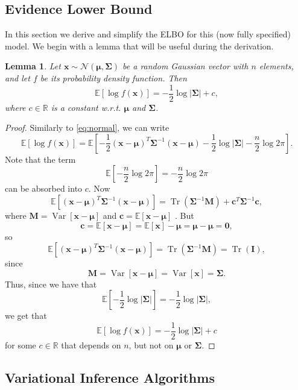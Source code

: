 \documentclass{mprop}
\newtheorem{lemma}{Lemma}
\theoremstyle{definition}
\DeclareMathOperator{\Tr}{Tr}
\DeclareMathOperator{\Var}{Var}
\begin{document}
\subsection{Evidence Lower Bound}

In this section we derive and simplify the ELBO for this (now fully specified)
model. We begin with a lemma that will be useful during the derivation.

\begin{lemma}
  Let $\mathbf{x} \sim \mathcal{N}(\bm\mu, \bm\Sigma)$ be a random Gaussian
  vector with $n$ elements, and let $f$ be its probability density function.
  Then
  \[ \mathbb{E}[\log f(\mathbf{x})] = -\frac{1}{2}\log |\bm\Sigma| + c, \]
  where $c \in \mathbb{R}$ is a constant w.r.t. $\bm\mu$ and $\bm\Sigma$.
\end{lemma}

\begin{proof} %
  Similarly to \eqref{eq:normal}, we can write
  \[ \mathbb{E}[\log f(\mathbf{x})] = \mathbb{E}\left[ -\frac{1}{2}(\mathbf{x} -
      \bm\mu)^T\bm\Sigma^{-1}(\mathbf{x} - \bm\mu) - \frac{1}{2}\log |\bm\Sigma|
      - \frac{n}{2}\log 2\pi \right]. \]
  Note that the term
  \[ \mathbb{E}\left[ -\frac{n}{2}\log 2\pi \right] = -\frac{n}{2}\log 2\pi \]
  can be absorbed into $c$. Now
  \[ \mathbb{E}[(\mathbf{x} - \bm\mu)^T\bm\Sigma^{-1}(\mathbf{x} - \bm\mu)] =
    \Tr(\bm\Sigma^{-1}\mathbf{M}) + \mathbf{c}^T\bm\Sigma^{-1}\mathbf{c}, \]
  where $\mathbf{M} = \Var[\mathbf{x} - \bm\mu]$ and $\mathbf{c} =
  \mathbb{E}[\mathbf{x} - \bm\mu]$ \cite{petersen2008matrix}. But
  \[ \mathbf{c} = \mathbb{E}[\mathbf{x} - \bm\mu] = \mathbb{E}[\mathbf{x}] -
    \bm\mu = \bm\mu - \bm\mu = \mathbf{0}, \]
  so
  \[ \mathbb{E}[(\mathbf{x} - \bm\mu)^T\bm\Sigma^{-1}(\mathbf{x} - \bm\mu)] =
    \Tr(\bm\Sigma^{-1}\mathbf{M}) = \Tr(\mathbf{I}), \]
  since
  \[ \mathbf{M} = \Var[\mathbf{x} - \bm\mu] = \Var[\mathbf{x}] = \bm\Sigma. \]
  Thus, since we have that
  \[ \mathbb{E}\left[ -\frac{1}{2}\log |\bm\Sigma| \right] = -\frac{1}{2}\log
    |\bm\Sigma|, \]
  we get that
  \[ \mathbb{E}[\log f(\mathbf{x})] = -\frac{1}{2}\log |\bm\Sigma| + c \]
  for some $c \in \mathbb{R}$ that depends on $n$, but not on $\bm\mu$ or
  $\bm\Sigma$.
\end{proof}

\subsection{Variational Inference Algorithms} \label{vi_algs}
\end{document}
